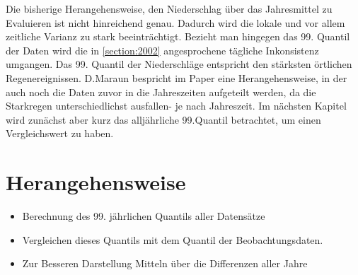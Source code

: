 Die bisherige Herangehensweise, den Niederschlag über das Jahresmittel zu Evaluieren ist nicht hinreichend genau. Dadurch wird die lokale und vor allem zeitliche Varianz zu stark beeinträchtigt. Bezieht man hingegen das 99. Quantil der Daten wird die in \ref{section:2002} angesprochene tägliche Inkonsistenz umgangen. Das 99. Quantil der Niederschläge entspricht den stärksten örtlichen Regenereignissen. D.Maraun bespricht im Paper \cite{biasMaraun} eine Herangehensweise, in der auch noch die Daten zuvor in die Jahreszeiten aufgeteilt werden, da die Starkregen unterschiedlichst ausfallen- je nach Jahreszeit. Im nächsten Kapitel wird zunächst aber kurz das alljährliche 99.Quantil betrachtet, um einen Vergleichswert zu haben.
\section{Herangehensweise}
\begin{itemize}
	\item Berechnung des 99. jährlichen Quantils aller Datensätze
	\item Vergleichen dieses Quantils mit dem Quantil der Beobachtungsdaten.
	\item Zur Besseren Darstellung Mitteln über die Differenzen aller Jahre
\end{itemize}

